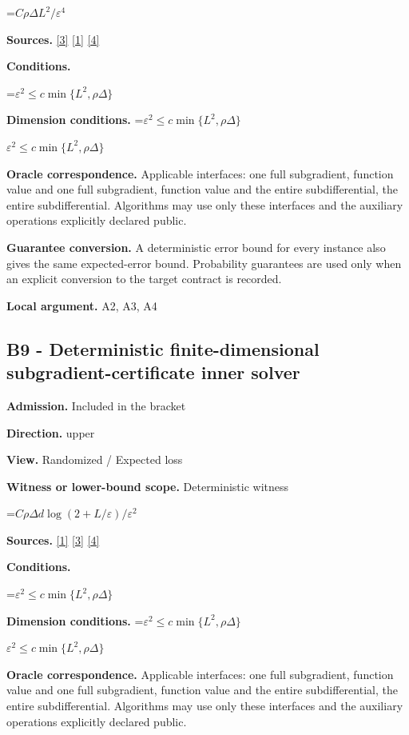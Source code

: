 \documentclass[10pt,a4paper]{article}
\newcommand{\AtlasMath}[1]{\par\begingroup\centering\setbox0=\hbox{$\displaystyle #1$}\ifdim\wd0>1.4\linewidth\typeout{ATLAS WIDE FORMULA: \the\wd0}\fi\ifdim\wd0>\linewidth\resizebox{\linewidth}{!}{\box0}\else\box0\fi\par\endgroup}
\newcommand{\AtlasInlineMath}[1]{\begingroup\setbox0=\hbox{$#1$}\ifdim\wd0>.4\linewidth\endgroup\AtlasMath{#1}\else\endgroup$#1$\fi}
\begin{document}
\AtlasMath{C\rho\Delta L^2/\varepsilon^4}
\textbf{Sources.} \href{https://arxiv.org/pdf/1405.4980}{[3]} \href{https://www2.isye.gatech.edu/~nemirovs/MOR_AccuracyCertificates.pdf}{[1]} \href{https://arxiv.org/pdf/2609.20701}{[4]}

\textbf{Conditions.} 
\AtlasMath{\varepsilon^2\le c\min\{L^2,\rho\Delta\}}


\textbf{Dimension conditions.} \AtlasInlineMath{\varepsilon^2\le c\min\{L^2,\rho\Delta\}}

\textbf{Oracle correspondence.} Applicable interfaces: one full subgradient, function value and one full subgradient, function value and the entire subdifferential, the entire subdifferential. Algorithms may use only these interfaces and the auxiliary operations explicitly declared public.

\textbf{Guarantee conversion.} A deterministic error bound for every instance also gives the same expected-error bound. Probability guarantees are used only when an explicit conversion to the target contract is recorded.

\textbf{Local argument.} A2, A3, A4

\subsection{B9 - Deterministic finite-dimensional subgradient-certificate inner solver}
\textbf{Admission.} Included in the bracket

\textbf{Direction.} upper

\textbf{View.} Randomized / Expected loss

\textbf{Witness or lower-bound scope.} Deterministic witness

\AtlasMath{C\rho\Delta d\log(2+L/\varepsilon)/\varepsilon^2}
\textbf{Sources.} \href{https://www2.isye.gatech.edu/~nemirovs/MOR_AccuracyCertificates.pdf}{[1]} \href{https://arxiv.org/pdf/1405.4980}{[3]} \href{https://arxiv.org/pdf/2609.20701}{[4]}

\textbf{Conditions.} 
\AtlasMath{\varepsilon^2\le c\min\{L^2,\rho\Delta\}}


\textbf{Dimension conditions.} \AtlasInlineMath{\varepsilon^2\le c\min\{L^2,\rho\Delta\}}

\textbf{Oracle correspondence.} Applicable interfaces: one full subgradient, function value and one full subgradient, function value and the entire subdifferential, the entire subdifferential. Algorithms may use only these interfaces and the auxiliary operations explicitly declared public.
\end{document}
